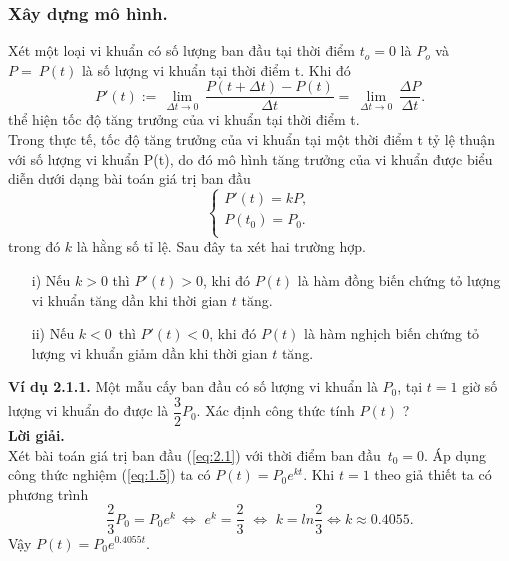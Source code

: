 \subsubsection{Xây dựng mô hình.}
Xét một loại vi khuẩn có số lượng ban đầu tại thời điểm ${{t}_{o}}=0$ là $P_o$ và $P =~ P(t)$ là số lượng vi khuẩn tại thời điểm t. Khi đó $$P'(t):=\,\underset{\Delta t\to 0}{\mathop{\lim }}\,\dfrac{P(t+\Delta t)-P(t)}{\Delta t}=~\underset{\Delta t\to 0}{\mathop{\lim }}\,\dfrac{\Delta P}{\Delta t}.$$ thể hiện tốc độ tăng trưởng của vi khuẩn tại thời điểm t.\\
Trong thực tế, tốc độ tăng trưởng của vi khuẩn tại một thời điểm t tỷ lệ thuận với số lượng vi khuẩn P(t), do đó mô hình tăng trưởng của vi khuẩn được biểu diễn dưới dạng bài toán giá trị ban đầu                              
\begin{equation}
	\left\{\begin{array}{l}
	 P'(t)=kP, \\ 
	 P({{t}_{0}})={{P}_{0}}. \\ 
\end{array} \right.
\label{eq:2.1}
\end{equation}
trong đó $k$ là hằng số tỉ lệ. Sau đây ta xét hai trường hợp.
\begin{itemize}
	\item[i)]	Nếu $k>0$ thì ${P}'(t)>0$, khi đó $P(t)$ là hàm đồng biến chứng tỏ lượng vi khuẩn tăng dần khi thời gian $t$ tăng.
	\item[ii)]	Nếu $k<0\,$ thì ${P}'(t)<0$, khi đó $P(t)$ là hàm nghịch biến chứng tỏ lượng vi khuẩn giảm dần khi thời gian $t$ tăng.
\end{itemize}
\textbf{Ví dụ 2.1.1. } Một mẫu cấy ban đầu có số lượng vi khuẩn là ${{P}_{0}}$, tại $t = 1$ giờ số lượng vi khuẩn đo được là $\dfrac{3}{2}{{P}_{0}}$. Xác định công thức tính $P(t)$ ?\\
\textbf{Lời giải. }\\
Xét bài toán giá trị ban đầu (\ref{eq:2.1}) với thời điểm ban đầu $\,{{t}_{0}}=0$. Áp dụng công thức nghiệm (\ref{eq:1.5}) ta có $P(t)={{P}_{0}}{{e}^{kt}}$. Khi $t=1 $ theo giả thiết ta có phương trình                              
$$\dfrac{2}{3}{{P}_{0}}={{P}_{0}}{{e}^{k}}\,\Leftrightarrow \,\,{{e}^{k}}=\dfrac{2}{3}\,\,\Leftrightarrow \,\,k=ln\dfrac{2}{3}\Leftrightarrow k\approx 0.4055.$$
Vậy $P(t)={{P}_{0}}{{e}^{0.4055t}}$. 
